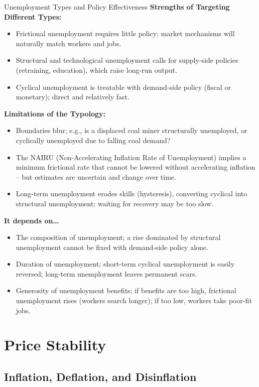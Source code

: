 \documentclass[11pt, a4paper, twoside]{book}
\begin{document}
\begin{evaluation}{Unemployment Types and Policy Effectiveness}
\textbf{Strengths of Targeting Different Types:}
\begin{itemize}[leftmargin=*, nosep]
\item Frictional unemployment requires little policy; market mechanisms will naturally match workers and jobs.
\item Structural and technological unemployment calls for supply-side policies (retraining, education), which raise long-run output.
\item Cyclical unemployment is treatable with demand-side policy (fiscal or monetary); direct and relatively fast.
\end{itemize}
\textbf{Limitations of the Typology:}
\begin{itemize}[leftmargin=*, nosep]
\item Boundaries blur; e.g., is a displaced coal miner structurally unemployed, or cyclically unemployed due to falling coal demand?
\item The NAIRU (Non-Accelerating Inflation Rate of Unemployment) implies a minimum frictional rate that cannot be lowered without accelerating inflation -- but estimates are uncertain and change over time.
\item Long-term unemployment erodes skills (hysteresis), converting cyclical into structural unemployment; waiting for recovery may be too slow.
\end{itemize}
\textbf{It depends on\ldots}
\begin{itemize}[leftmargin=*, nosep]
\item The composition of unemployment; a rise dominated by structural unemployment cannot be fixed with demand-side policy alone.
\item Duration of unemployment; short-term cyclical unemployment is easily reversed; long-term unemployment leaves permanent scars.
\item Generosity of unemployment benefits; if benefits are too high, frictional unemployment rises (workers search longer); if too low, workers take poor-fit jobs.
\end{itemize}
\end{evaluation}

\section{Price Stability}

\subsection{Inflation, Deflation, and Disinflation}
\end{document}
